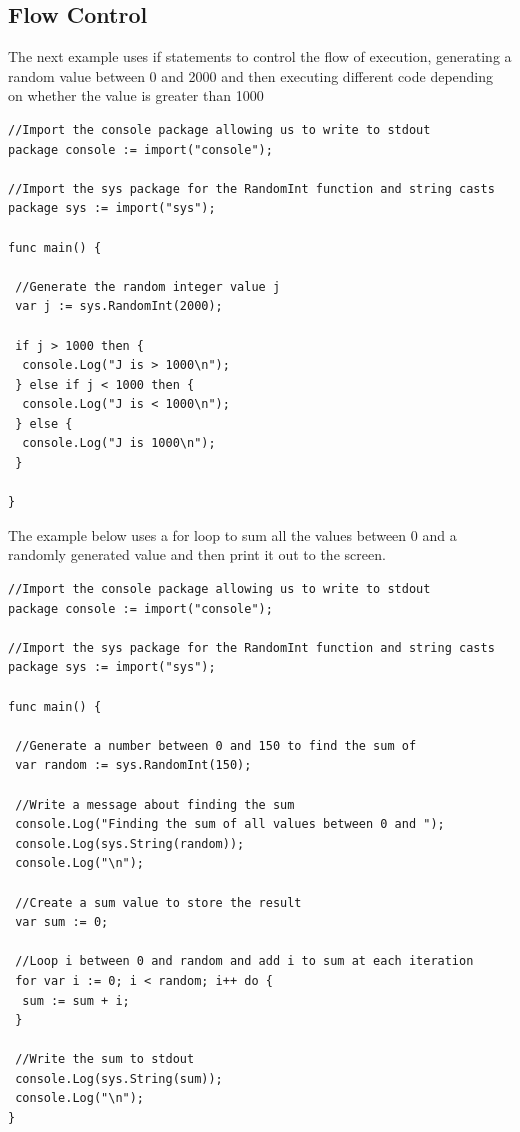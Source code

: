 \documentclass[]{final_report}
\begin{document}
\subsection{Flow Control}

The next example uses if statements to control the flow of execution, generating a random value between 0 and 2000 and then executing different code depending on whether the value is greater than 1000

\begin{verbatim}
//Import the console package allowing us to write to stdout
package console := import("console");

//Import the sys package for the RandomInt function and string casts
package sys := import("sys");

func main() {

 //Generate the random integer value j
 var j := sys.RandomInt(2000);

 if j > 1000 then {
  console.Log("J is > 1000\n");
 } else if j < 1000 then {
  console.Log("J is < 1000\n");
 } else {
  console.Log("J is 1000\n");
 }

}
\end{verbatim}

The example below uses a for loop to sum all the values between 0 and a randomly generated value and then print it out to the screen.

\begin{verbatim}
//Import the console package allowing us to write to stdout
package console := import("console");

//Import the sys package for the RandomInt function and string casts
package sys := import("sys");

func main() {

 //Generate a number between 0 and 150 to find the sum of
 var random := sys.RandomInt(150);

 //Write a message about finding the sum
 console.Log("Finding the sum of all values between 0 and ");
 console.Log(sys.String(random));
 console.Log("\n");
 
 //Create a sum value to store the result
 var sum := 0;
 
 //Loop i between 0 and random and add i to sum at each iteration
 for var i := 0; i < random; i++ do {
  sum := sum + i;
 }  
 
 //Write the sum to stdout
 console.Log(sys.String(sum));
 console.Log("\n"); 
}
\end{verbatim}
\end{document}
